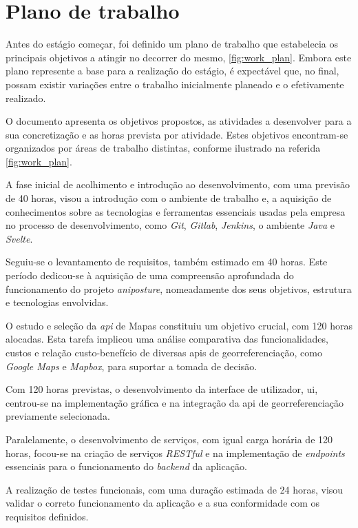 \chapter{Plano de trabalho}%
\label{chapter:work-plan}

Antes do estágio começar, foi definido um plano de trabalho que estabelecia os principais objetivos a atingir no decorrer do mesmo, \autoref{fig:work_plan}. Embora este plano represente a base para a realização do estágio, é expectável que, no final, possam existir variações entre o trabalho inicialmente planeado e o efetivamente realizado.

O documento apresenta os objetivos propostos, as atividades a desenvolver para a sua concretização e as horas prevista por atividade. Estes objetivos encontram-se organizados por áreas de trabalho distintas, conforme ilustrado na referida \autoref{fig:work_plan}.

A fase inicial de acolhimento e introdução ao desenvolvimento, com uma previsão de 40 horas, visou a introdução com o ambiente de trabalho e, a aquisição de conhecimentos sobre as tecnologias e ferramentas essenciais usadas pela empresa no processo de desenvolvimento, como \textit{Git}, \textit{Gitlab}, \textit{Jenkins}, o ambiente \textit{Java} e \textit{Svelte}.

Seguiu-se o levantamento de requisitos, também estimado em 40 horas. Este período dedicou-se à aquisição de uma compreensão aprofundada do funcionamento do projeto \textit{aniposture}, nomeadamente dos seus objetivos, estrutura e tecnologias envolvidas.

O estudo e seleção da \textit{\acs{api}} de Mapas constituiu um objetivo crucial, com 120 horas alocadas. Esta tarefa implicou uma análise comparativa das funcionalidades, custos e relação custo-benefício de diversas \acs{api}s de georreferenciação, como \textit{Google Maps} e \textit{Mapbox}, para suportar a tomada de decisão.

Com 120 horas previstas, o desenvolvimento da interface de utilizador, \acs{ui}, centrou-se na implementação gráfica e na integração da \acs{api} de georreferenciação previamente selecionada.

Paralelamente, o desenvolvimento de serviços, com igual carga horária de 120 horas, focou-se na criação de serviços \textit{RESTful} e na implementação de \textit{endpoints} essenciais para o funcionamento do \textit{backend} da aplicação.

A realização de testes funcionais, com uma duração estimada de 24 horas, visou validar o correto funcionamento da aplicação e a sua conformidade com os requisitos definidos.

